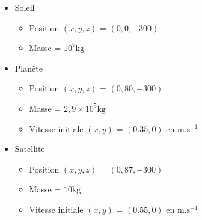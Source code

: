 \documentclass{article}
\begin{document}
\begin{itemize}
\item Soleil
\begin{itemize}
\item Position $(x,y,z)$ = $(0,0,-300)$
\item Masse = $10^7 \mathrm{kg}$
\end{itemize}
\item Planète
\begin{itemize}
\item Position $(x,y,z)$ = $(0,80,-300)$
\item Masse = $2,9\times10^5 \mathrm{kg}$
\item Vitesse initiale $(x,y)$ = $(0.35,0)$ en $\mathrm{m.s^{-1}}$
\end{itemize}
\item Satellite
\begin{itemize}
\item Position $(x,y,z)$ = $(0,87,-300)$
\item Masse = $10 \mathrm{kg}$
\item Vitesse initiale $(x,y)$ = $(0.55,0)$ en $\mathrm{m.s^{-1}}$
\end{itemize}
\end{itemize}
\end{document}
